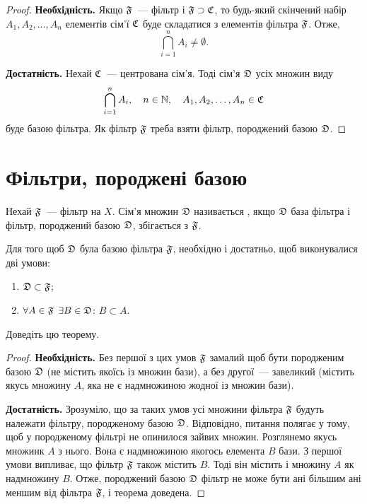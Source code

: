 \begin{proof}
    \textbf{Необхідність.} Якщо $\frak F$~--- фільтр і $\frak F \supset \frak C$, то будь-який скінчений набір $A_1, A_2, \dots, A_n$ елементів сім'ї $\frak C$ буде складатися з елементів фільтра $\frak F$. Отже, 
    \begin{equation*}
        \bigcap_{i = 1}^n A_i \ne \emptyset.
    \end{equation*}

    \textbf{Достатність.} Нехай $\frak C$~--- центрована сім'я. Тоді сім'я $\frak D$ усіх множин виду
    \begin{equation*}
        \bigcap_{i = 1}^n A_i, \quad n \in \NN, \quad A_1, A_2, \dots, A_n \in \frak C
    \end{equation*}
    буде базою фільтра. Як фільтр $\frak F$ треба взяти фільтр, породжений базою $\frak D$.
\end{proof}

\section{Фільтри, породжені базою}

\begin{definition}
    Нехай $\frak F$~--- фільтр на $X$. Сім'я множин $\frak D$ називається , якщо $\frak D$ база фільтра і фільтр, породжений базою $\frak D$, збігається з $\frak F$.
\end{definition}

\begin{theorem}
    \label{th:filterbase-criterion}
    Для того щоб $\frak D$ була базою фільтра $\frak F$, необхідно і достатньо, щоб виконувалися дві умови:
    \begin{enumerate}
        \item $\frak D \subset \frak F$;
        \item $\forall A \in \frak F$ $\exists B \in \frak D$: $B \subset A$.
    \end{enumerate}
\end{theorem}

\begin{exercise}
    Доведіть цю теорему.
\end{exercise}
\begin{proof}
    \textbf{Необхідність.} Без першої з цих умов $\frak F$ замалий щоб бути породженим базою $\frak D$ (не містить якоїсь із множин бази), а без другої~--- завеликий (містить якусь множину $A$, яка не є надмножиною жодної із множин бази). 
    
    \textbf{Достатність.} Зрозуміло, що за таких умов усі множини фільтра $\frak F$ будуть належати фільтру, породженому базою $\frak D$. Відповідно, питання полягає у тому, щоб у породженому фільтрі не опинилося зайвих множин. Розглянемо якусь множинк $A$ з нього. Вона є надмножиною якогось елемента $B$ бази. З першої умови випливає, що фільтр $\frak F$ також містить $B$. Тоді він містить і множину $A$ як надмножину $B$. Отже, породжений базою $\frak D$ фільтр не може бути ані більшим ані меншим від фільтра $\frak F$, і теорема доведена.
\end{proof}

